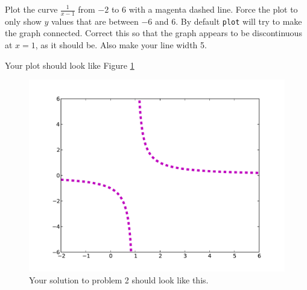	
\begin{problem} Plot the curve $\frac{1}{x-1}$ from $-2$ to $6$ with a 
magenta dashed line. Force the plot to only show $y$ values that are between 
$-6$ and $6$.  By default \texttt{plot} will try to make the graph connected.  
Correct this so that the graph appears to be discontinuous at $x=1$, as it should be.
Also make your line width 5.

Your plot should look like Figure \ref{mpl:problem2} 
\end{problem}

\begin{figure}
\includegraphics[width=\textwidth]{prob2.pdf}
\caption{Your solution to problem 2 should look like this.}
\label{mpl:problem2} 
\end{figure}

